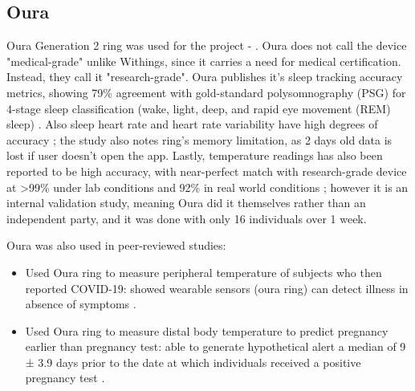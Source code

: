 \subsection{Oura}
\label{section:OuraRing}
Oura Generation 2 ring was used for the project - \cite{ouraStorePage}. Oura does not call the device "medical-grade" unlike Withings, since it carries a need for medical certification. Instead, they call it "research-grade". Oura publishes it's sleep tracking accuracy metrics, showing 79\% agreement with gold-standard polysomnography (PSG) for 4-stage sleep classification (wake, light, deep, and rapid eye movement (REM) sleep) \cite{OuraSleepAcc}. Also sleep heart rate and heart rate variability have high degrees of accuracy \cite{ouraHeartAcc}; the study also notes ring's memory limitation, as 2 days old data is lost if user doesn't open the app. Lastly, temperature readings has also been reported to be high accuracy, with near-perfect match with research-grade device at >99\% under lab conditions and 92\% in real world conditions \cite{ouraTemp}; however it is an internal validation study, meaning Oura did it themselves rather than an independent party, and it was done with only 16 individuals over 1 week.

Oura was also used in peer-reviewed studies:
\begin{itemize}
    \item Used Oura ring to measure peripheral temperature of subjects who then reported COVID-19: showed wearable sensors (oura ring) can detect illness in absence of symptoms \cite{smarr2020feasibility}.
    \item Used Oura ring to measure distal body temperature to predict pregnancy earlier than pregnancy test: able to generate hypothetical alert a median of 9 ± 3.9 days prior to the date at which individuals received a positive pregnancy test \cite{ouraPregnancy}.
\end{itemize}
